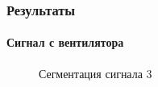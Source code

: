 \documentclass[9pt]{beamer}
\begin{document}
\begin{frame}\frametitle{Результаты}
\framesubtitle{Сигнал с вентилятора}

\begin{figure}[h]
\begin{minipage}[h]{0.49\linewidth}
\end{minipage}
\begin{minipage}[h]{0.49\linewidth}
\end{minipage}
\caption{Сегментация сигнала 3}
\end{figure}
\end{frame}
\end{document}
